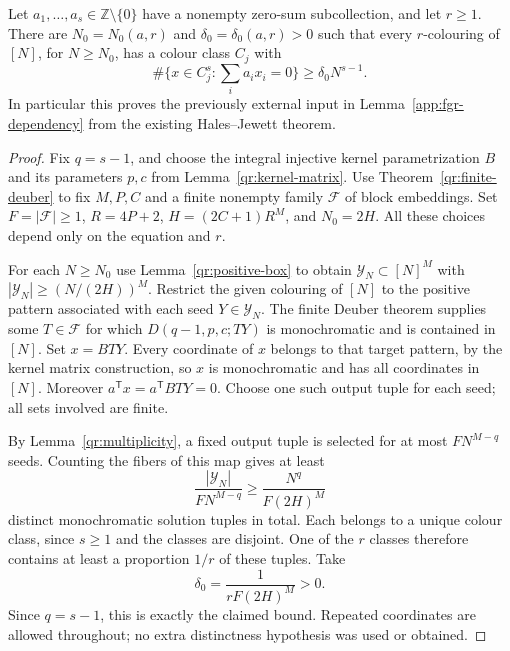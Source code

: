 \begin{theorem}
\label{qr:many-monochromatic}
\leanok
{}
Let $a_1,\ldots,a_s\in\mathbb Z\setminus\{0\}$ have a nonempty zero-sum
subcollection, and let $r\geq1$.  There are $N_0=N_0(a,r)$ and
$\delta_0=\delta_0(a,r)>0$ such that every $r$-colouring of $[N]$, for
$N\geq N_0$, has a colour class $C_j$ with
\[
 \#\{x\in C_j^s:\textstyle\sum_i a_i x_i=0\}
 \geq\delta_0N^{s-1}.
\]
In particular this proves the previously external input in
Lemma~\ref{app:fgr-dependency} from the existing Hales--Jewett theorem.
\end{theorem}
\begin{proof}
Fix $q=s-1$, and choose the integral injective kernel parametrization
$B$ and its parameters $p,c$ from Lemma~\ref{qr:kernel-matrix}.
Use Theorem~\ref{qr:finite-deuber} to fix $M,P,C$ and a finite nonempty
family $\mathcal F$ of block embeddings.
Set $F=|\mathcal F|\geq1$, $R=4P+2$, $H=(2C+1)R^M$, and $N_0=2H$.
All these choices depend only on the equation and $r$.

For each $N\geq N_0$ use Lemma~\ref{qr:positive-box} to obtain
$\mathcal Y_N\subset[N]^M$ with
$|\mathcal Y_N|\geq(N/(2H))^M$.
Restrict the given colouring of $[N]$ to the positive pattern associated
with each seed $Y\in\mathcal Y_N$.
The finite Deuber theorem supplies some $T\in\mathcal F$ for which
$D(q-1,p,c;TY)$ is monochromatic and is contained in $[N]$.
Set $x=BTY$.
Every coordinate of $x$ belongs to that target pattern, by the kernel
matrix construction, so $x$ is monochromatic and has all coordinates in
$[N]$.  Moreover $a^{\mathsf T}x=a^{\mathsf T}BTY=0$.
Choose one such output tuple for each seed; all sets involved are finite.

By Lemma~\ref{qr:multiplicity}, a fixed output tuple is selected for at
most $FN^{M-q}$ seeds.  Counting the fibers of this map gives at least
\[
 \frac{|\mathcal Y_N|}{FN^{M-q}}
 \geq \frac{N^q}{F(2H)^M}
\]
distinct monochromatic solution tuples in total.
Each belongs to a unique colour class, since $s\geq1$ and the classes
are disjoint.  One of the $r$ classes therefore contains at least a
proportion $1/r$ of these tuples.
Take
\[
 \delta_0=\frac1{rF(2H)^M}>0.
\]
Since $q=s-1$, this is exactly the claimed bound.
Repeated coordinates are allowed throughout; no extra distinctness
hypothesis was used or obtained.


\end{proof}
